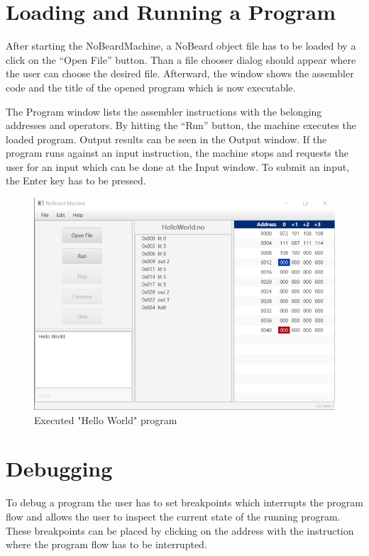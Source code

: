 \section{Loading and Running a Program}
After starting the NoBeardMachine, a NoBeard object file has to be loaded by a click on the “Open File” button. Than a file chooser dialog should appear where the user can choose the desired file. Afterward, the window shows the assembler code and the title of the opened program which is now executable.

The Program window lists the assembler instructions with the belonging addresses and operators. By hitting the “Run” button, the machine executes the loaded program. Output results can be seen in the Output window. If the program runs against an input instruction, the machine stops and requests the user for an input which can be done at the Input window. To submit an input, the Enter key has to be pressed.
\begin{figure}[h] 
	\centering
	\includegraphics[scale=.85]{images/screenshot-1.png}
	\caption{Executed "Hello World" program}
\end{figure}

\section{Debugging}
To debug a program the user has to set breakpoints which interrupts the program flow and allows the user to inspect the current state of the running program. These breakpoints can be placed by clicking on the address with the instruction where the program flow has to be interrupted. 


